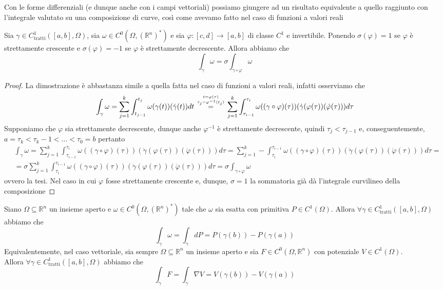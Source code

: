 Con le forme differenziali (e dunque anche con i campi vettoriali) possiamo giungere ad un risultato equivalente a quello raggiunto
con l'integrale valutato su una composizione di curve, così come avevamo fatto nel caso di funzioni a valori reali
\begin{theorem}[di invarianza]
	Sia $\gamma \in C^1_{\text{tratti}}([a, b], \Omega)$, sia $\omega \in C^0(\Omega, (\mathbb{R}^n)^*)$ e sia $\varphi: [c, d] \to [a, b]$
	di classe $C^1$ e invertibile. Ponendo $\sigma(\varphi)= 1$ se $\varphi$ è strettamente crescente e $\sigma(\varphi)=-1$ se $\varphi$ è strettamente decrescente.
	Allora abbiamo che
	$$
		\int_\gamma \omega = \sigma \int_{\gamma \circ \varphi} \omega
	$$
	\label{thm:teo_di_invarianza}
\end{theorem}
\begin{proof}
La dimostrazione è abbastanza simile a quella fatta nel caso di funzioni a valori reali, infatti osserviamo che
$$
\int_{\gamma} \omega = \sum_{j=1}^k \int_{t_{j-1}}^{t_j} \omega(\gamma(t))(\dot{\gamma}(t))dt \stackrel{t=\varphi(\tau) \atop \tau_j = \varphi^{-1}(t_j)}{=} \sum_{j=1}^k \int_{\tau_{i-1}}^{\tau_{i}} \omega((\gamma \circ \varphi)(\tau))(\dot{\gamma}(\varphi(\tau))(\dot{\varphi}(\tau)))d\tau
$$
Supponiamo che $\varphi$ sia strettamente decrescente, dunque anche $\varphi^{-1}$ è strettamente decrescente, quindi $\tau_j < \tau_{j-1}$ e, conseguentemente, $a = \tau_k < \tau_k-1 < \ldots < \tau_0 = b$ pertanto
\begin{align*}
&\int_\gamma \omega = \sum_{j=1}^k \int_{\tau_{i-1}}^{\tau_{i}} \omega((\gamma \circ \varphi)(\tau))(\dot{\gamma}(\varphi(\tau))(\dot{\varphi}(\tau)))d\tau = \sum_{j=1}^k - \int_{\tau_{i}}^{\tau_{i-1}} \omega((\gamma \circ \varphi)(\tau))(\dot{\gamma}(\varphi(\tau))(\dot{\varphi}(\tau)))d\tau = \\
&= \sigma \sum_{j=1}^k \int_{\tau_{i}}^{\tau_{i-1}} \omega((\gamma \circ \varphi)(\tau))(\dot{\gamma}(\varphi(\tau))(\dot{\varphi}(\tau)))d\tau = \sigma \int_{\gamma \circ \varphi} \omega
\end{align*}
ovvero la tesi. Nel caso in cui $\varphi$ fosse strettamente crescente e, dunque, $\sigma=1$ la sommatoria già dà l'integrale curvilineo della composizione
\end{proof}
\begin{prop}
	Siano $\Omega \subseteq \mathbb{R}^n$ un insieme aperto e $\omega \in C^0(\Omega, (\mathbb{R}^n)^*)$ tale che $\omega$ sia esatta con primitiva $P \in C^1(\Omega)$.
	Allora $\forall \gamma \in C^1_{\text{tratti}}([a, b], \Omega)$ abbiamo che
	$$
		\int_{\gamma} \omega = \int_{\gamma} dP = P(\gamma(b)) - P(\gamma(a))
	$$
	\noindent Equivalentemente, nel caso vettoriale, sia sempre $\Omega \subseteq \mathbb{R}^n$ un insieme aperto e sia $F \in C^0(\Omega, \mathbb{R}^n)$ con potenziale $V \in C^1(\Omega)$. \\ Allora $\forall \gamma \in C^1_{\text{tratti}}([a, b], \Omega)$ abbiamo che
	$$
		\int_{\gamma} F = \int_{\gamma} \nabla V = V(\gamma(b)) - V(\gamma(a))
	$$
\end{prop}

